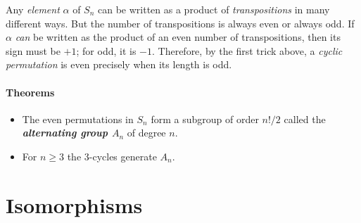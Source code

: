 \documentclass[a4paper,twocolumn,10pt]{article}
\begin{document}
  Any \textit{element} $\alpha$ of $S_n$ can be written as a product of
  \textit{transpositions} in many different ways. But the number of
  transpositions is always even or always odd. If $\alpha$ \textit{can} be
  written as the product of an even number of transpositions, then its sign
  must be $+1$; for odd, it is $-1$. Therefore, by the first trick above, a
  \textit{cyclic permutation} is even precisely when its length is odd.

  \paragraph{Theorems}
  \begin{itemize}
    \item The even permutations in $S_n$ form a subgroup of order $n!/2$ called
      the \textbf{\textit{alternating group $A_n$}} of degree $n$.
    \item For $n\geqslant 3$ the 3-cycles generate $A_n$.
  \end{itemize}

  \section{Isomorphisms}
\end{document}
